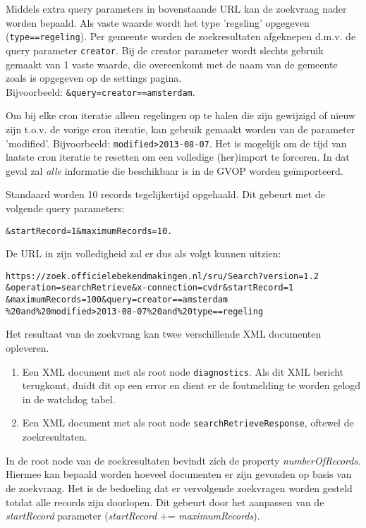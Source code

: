 Middels extra query parameters in bovenstaande URL kan de zoekvraag nader worden bepaald. Als vaste waarde wordt het type 'regeling' opgegeven (\texttt{type==regeling}). Per gemeente worden de zoekresultaten afgeknepen d.m.v. de query parameter \texttt{creator}. Bij de creator parameter wordt slechts gebruik gemaakt van 1 vaste waarde, die overeenkomt met de naam van de gemeente zoals is opgegeven op de settings pagina.
\\ Bijvoorbeeld: \texttt{\&query=creator==amsterdam}.

Om bij elke cron iteratie alleen regelingen op te halen die zijn gewijzigd of nieuw zijn t.o.v. de vorige cron iteratie, kan gebruik gemaakt worden van de parameter 'modified'. Bijvoorbeeld: \texttt{modified\textgreater2013-08-07}. Het is mogelijk om de tijd van laatste cron iteratie te resetten om een volledige (her)import te forceren. In dat geval zal \emph{alle} informatie die beschikbaar is in de GVOP worden ge\"{i}mporteerd.

Standaard worden 10 records tegelijkertijd opgehaald. Dit gebeurt met de volgende query parameters:
\begin{verbatim}
&startRecord=1&maximumRecords=10.
\end{verbatim}

De URL in zijn volledigheid zal er dus als volgt kunnen uitzien:

\begin{verbatim}
https://zoek.officielebekendmakingen.nl/sru/Search?version=1.2
&operation=searchRetrieve&x-connection=cvdr&startRecord=1
&maximumRecords=100&query=creator==amsterdam
%20and%20modified>2013-08-07%20and%20type==regeling
\end{verbatim}

Het resultaat van de zoekvraag kan twee verschillende XML documenten opleveren.

\begin{enumerate}
\item Een XML document met als root node \texttt{diagnostics}. Als dit XML bericht terugkomt, duidt dit op een error en dient er de foutmelding te worden gelogd in de watchdog tabel.
\item Een XML document met als root node \texttt{searchRetrieveResponse}, oftewel de zoekresultaten.
\end{enumerate}

In de root node van de zoekresultaten bevindt zich de property \emph{numberOfRecords}. Hiermee kan bepaald worden hoeveel documenten er zijn gevonden op basis van de zoekvraag. Het is de bedoeling dat er vervolgende zoekvragen worden gesteld totdat alle records zijn doorlopen. Dit gebeurt door het aanpassen van de \emph{startRecord} parameter (\emph{startRecord} += \emph{maximumRecords}).

